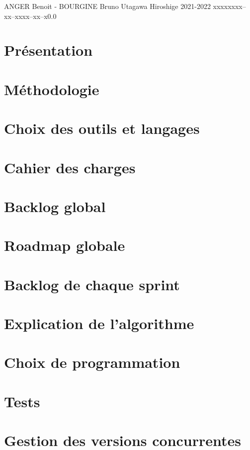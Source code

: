 \documentclass{tstextbook}
\begin{document}
       {ANGER Benoit - BOURGINE Bruno}
       {Utagawa Hiroshige}
       {2021-2022}
       {xxxxx}{xxx--xx--xxxx--xx--x}{0.0}
       {}
       {}


\chapter{Présentation} %


\chapter{Méthodologie}


\chapter{Choix des outils et langages}


\chapter{Cahier des charges}


\chapter{Backlog global}


\chapter{Roadmap globale}


\chapter{Backlog de chaque sprint}


\chapter{Explication de l'algorithme}


\chapter{Choix de programmation}


\chapter{Tests}


\chapter{Gestion des versions concurrentes}
\end{document}
